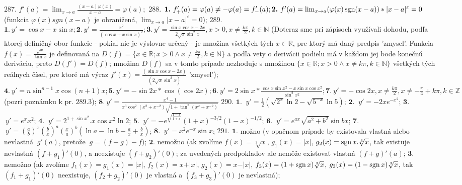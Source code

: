 $\boxed{287.}$
$f'(a)=\lim_{x\rightarrow a}\frac{(x-a)\varphi (x)}{x-a}=\varphi (a);$
$\boxed{288.}$
$\boldsymbol{1.}\ f'_+(a)=\varphi (a)\neq -\varphi (a)=f'_-(a);\boldsymbol{2.}\ f'(a)=\lim_{x\rightarrow a}(\varphi (x) \operatorname{sgn} (x-a))*|x-a|^{\varepsilon}=0$ (funkcia $\varphi (x) sgn (x-a)$ je ohranižená, $\lim_{x\rightarrow a}|x-a|^{\varepsilon}=0$);
$\boxed{289.}$
$\boldsymbol{1.}\ y'=\cos x - x\sin x;\boldsymbol{2.}\ y'=\frac{x^2}{(\cos x + x\sin x)^2};\boldsymbol{3.}\ y'=\frac{\sin x \cos x - 2x}{2\sqrt{x}\sin ^2 x},x>0,x\neq \frac{k\pi}{2},k\in \mathbb{N}$ (Doteraz sme pri zápisoch využívali dohodu, podľa ktorej definičný obor funkcie - pokiaľ nie je výslovne určený - je množina všetkých tých $x\in \mathbb{R}$, pre ktorý má daný predpis 'zmysel'. Funkcia $f(x)=\frac{\sqrt{x}}{\tan x}$ je definovaná na $D(f)=\{x\in \mathbb{R};x>0 \wedge x\neq \frac{k\pi}{2},k\in \mathbb{N}\}$ a podľa vety o derivácii podielu má v každom jej bode konečnú deriváciu, preto $D(f')=D(f)$; množina $D(f)$ sa v tomto prípade nezhoduje s množinou $\{x\in \mathbb{R}; x>0 \wedge x\neq k\pi, k\in \mathbb{N} \}$ všetkých tých reálnych čísel, pre ktoré má výraz $f'(x)=\frac{(\sin x \cos x - 2x)}{(2\sqrt{x}\sin ^2 x)}$ 'zmysel');$\boldsymbol{4.}\ y'=n\sin^{n-1}x \cos (n+1)x; \boldsymbol{5.}\ y'=-\sin 2x*\cos (\cos 2x);\boldsymbol{6.}\ y'=2\sin x * \frac{\cos x \sin x^2 - x\sin x \cos x^2}{\sin^2 x^2};\boldsymbol{7.}\ y'=-\cos 2x,x\neq \frac{k\pi}{2}, x\neq -\frac{\pi}{4}+k\pi,k\in \mathbb{Z}$ (pozri poznámku k pr. $289.3$); $\boldsymbol{8.}\ y'=\frac{x^4-1}{x^3\cos^2 (x^2+x^{-2})\sqrt{1+\tan^2(x^2+x^{-2})}}$
$\boxed{290.}$ 
$\boldsymbol{1.}$ $\ y'= \frac{1}{2}(\sqrt{2^{x}}\ln 2-\sqrt{5^{-x}} \ln 5)$;
$\boldsymbol{2.}$ $\ y'=-2x e^{-x^{2}}$;
$\boldsymbol{3.}$ $\ y'= e^{x}x^{2}$;
$\boldsymbol{4.}$ $\ y'= 2^{1+ \sin x^{2}}.x \cos x^{2}\ln 2$; 
$\boldsymbol{5.}$ $\ y'= -e^{\sqrt{\frac{1-x}{1+x}}}(1+x)^{-3/2}(1-x)^{-1/2}$;
$\boldsymbol{6.}$ $\ y'= e^{ax}\sqrt{a^{2}+b^{2}}\sin bx$;
$\boldsymbol{7.}$ $\ y'=(\frac{a}{b})^{x}(\frac{b}{x})^{a}(\frac{x}{a})^{b}(\ln a-\ln b-\frac{a}{x}+\frac{b}{x})$;
$\boldsymbol{8.}$ $\ y'= x^{2}e^{-x}\sin x$;
$\boxed{291.}$ 
$\boldsymbol{1.}$ možno (v opačnom prípade by existovala vlastná alebo nevlastná $\ g'(a) $, pretože  $\ g=(f+g)-f)$;
$\boldsymbol{2.}$ nemožno (ak zvolíme $f(x)=\sqrt[3]{x}$,  $g_{1}(x)=\vert x \vert$, $g_{2}(x)=\operatorname{sgn} x .\sqrt[3]{x}$, tak existuje nevlastná $(f+g_{1})'(0)$, a neexistuje $(f+g_{2})'(0)$; za uvedených predpokladov ale nemôže existovať vlastná $(f+g)'(a)$;
$\boldsymbol{3.}$ nemožno (ak zvolíme $f_{1}(x)=g_{1}(x)=\vert x \vert$, $f_{2}(x)=x+\vert x \vert$, $g_{2}(x)=x-\vert x \vert$, $f_{3}(x)=(1+ \operatorname{sgn} x)\sqrt[3]{x}$, $g_{3}(x)=(1- \operatorname{sgn} x)\sqrt[3]{x}$, tak $(f_{1}+g_{1})'(0)$ neexistuje, $(f_{2}+g_{2})'(0)$ je vlastná a $(f_{3}+g_{3})'(0)$ je nevlastná);
